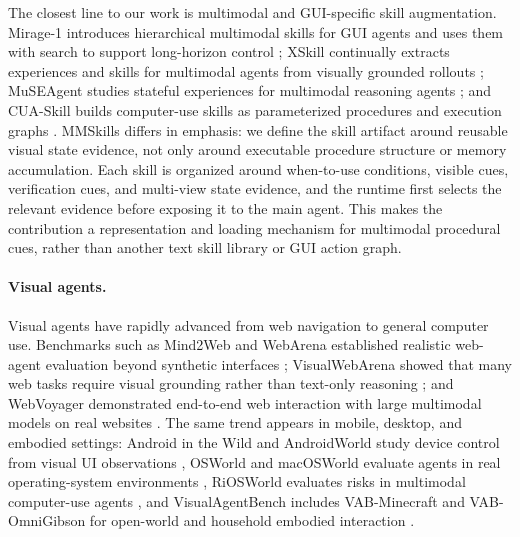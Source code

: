 The closest line to our work is multimodal and GUI-specific skill augmentation. Mirage-1 introduces hierarchical multimodal skills for GUI agents and uses them with search to support long-horizon control \citep{xie2025mirage}; XSkill continually extracts experiences and skills for multimodal agents from visually grounded rollouts \citep{jiang2026xskillcontinuallearningexperience}; MuSEAgent studies stateful experiences for multimodal reasoning agents \citep{wang2026museagentmultimodalreasoningagent}; and CUA-Skill builds computer-use skills as parameterized procedures and execution graphs \citep{chen2026cuaskill}. MMSkills differs in emphasis: we define the skill artifact around reusable visual state evidence, not only around executable procedure structure or memory accumulation. Each skill is organized around when-to-use conditions, visible cues, verification cues, and multi-view state evidence, and the runtime first selects the relevant evidence before exposing it to the main agent. This makes the contribution a representation and loading mechanism for multimodal procedural cues, rather than another text skill library or GUI action graph.

\paragraph{Visual agents.}
Visual agents have rapidly advanced from web navigation to general computer use. Benchmarks such as Mind2Web and WebArena established realistic web-agent evaluation beyond synthetic interfaces \citep{deng2023mind2web,zhou2024webarena}; VisualWebArena showed that many web tasks require visual grounding rather than text-only reasoning \citep{koh2024visualwebarena}; and WebVoyager demonstrated end-to-end web interaction with large multimodal models on real websites \citep{he2024webvoyager}. The same trend appears in mobile, desktop, and embodied settings: Android in the Wild and AndroidWorld study device control from visual UI observations \citep{rawles2023androidwild,rawles2025androidworld}, OSWorld and macOSWorld evaluate agents in real operating-system environments \citep{xie2024osworld,yang2025macosworld}, RiOSWorld evaluates risks in multimodal computer-use agents \citep{yang2025riosworldbenchmarkingriskmultimodal}, and VisualAgentBench includes VAB-Minecraft and VAB-OmniGibson for open-world and household embodied interaction \citep{liu2024visualagentbench}.

